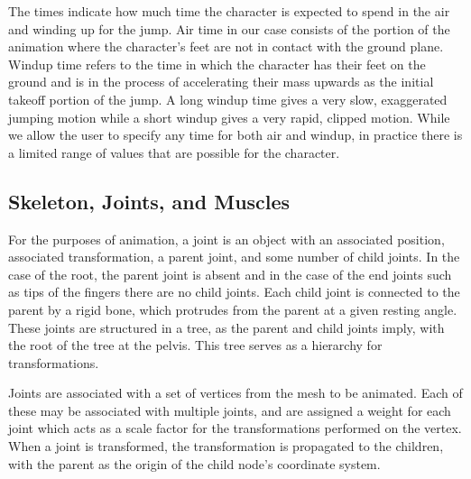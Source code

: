 The times indicate how much time the character is expected to spend in the air and winding up for the jump.  Air time in our case consists of the portion of the animation where the character's feet are not in contact with the ground plane.  Windup time refers to the time in which the character has their feet on the ground and is in the process of accelerating their mass upwards as the initial takeoff portion of the jump.  A long windup time gives a very slow, exaggerated jumping motion while a short windup gives a very rapid, clipped motion.  While we allow the user to specify any time for both air and windup, in practice there is a limited range of values that are possible for the character.


\subsection{Skeleton, Joints, and Muscles}
\label{subsection:skel_joints}
For the purposes of animation, a joint is an object with an associated position, associated transformation, a parent joint, and some number of child joints.  In the case of the root, the parent joint is absent and in the case of the end joints such as tips of the fingers there are no child joints.  Each child joint is connected to the parent by a rigid bone, which protrudes from the parent at a given resting angle.  These joints are structured in a tree, as the parent and child joints imply, with the root of the tree at the pelvis.  This tree serves as a hierarchy for transformations.

Joints are associated with a set of vertices from the mesh to be animated.  Each of these may be associated with multiple joints, and are assigned a weight for each joint which acts as a scale factor for the transformations performed on the vertex.  When a joint is transformed, the transformation is propagated to the children, with the parent as the origin of the child node's coordinate system.


